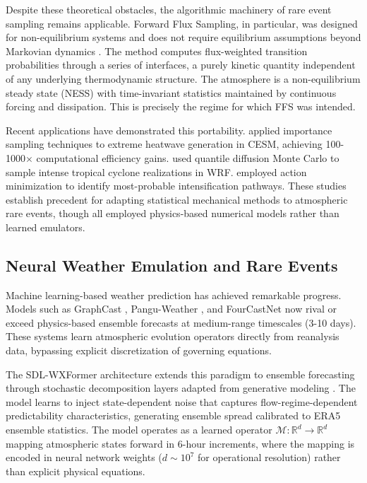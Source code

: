 \documentclass[11pt]{article}
\begin{document}
Despite these theoretical obstacles, the algorithmic machinery of rare event sampling remains applicable. Forward Flux Sampling, in particular, was designed for non-equilibrium systems and does not require equilibrium assumptions beyond Markovian dynamics \citep{allen2009forward}. The method computes flux-weighted transition probabilities through a series of interfaces, a purely kinetic quantity independent of any underlying thermodynamic structure. The atmosphere is a non-equilibrium steady state (NESS) with time-invariant statistics maintained by continuous forcing and dissipation. This is precisely the regime for which FFS was intended.

Recent applications have demonstrated this portability. \citet{ragone2018computation} applied importance sampling techniques to extreme heatwave generation in CESM, achieving 100-1000$\times$ computational efficiency gains. \citet{webber2019practical} used quantile diffusion Monte Carlo to sample intense tropical cyclone realizations in WRF. \citet{plotkin2019maximizing} employed action minimization to identify most-probable intensification pathways. These studies establish precedent for adapting statistical mechanical methods to atmospheric rare events, though all employed physics-based numerical models rather than learned emulators.

\subsection{Neural Weather Emulation and Rare Events}

Machine learning-based weather prediction has achieved remarkable progress. Models such as GraphCast \citep{lam2023graphcast}, Pangu-Weather \citep{bi2023pangu}, and FourCastNet \citep{pathak2022fourcastnet} now rival or exceed physics-based ensemble forecasts at medium-range timescales (3-10 days). These systems learn atmospheric evolution operators directly from reanalysis data, bypassing explicit discretization of governing equations.

The SDL-WXFormer architecture \citep{schreck2024sdl} extends this paradigm to ensemble forecasting through stochastic decomposition layers adapted from generative modeling \citep{karras2019stylebased}. The model learns to inject state-dependent noise that captures flow-regime-dependent predictability characteristics, generating ensemble spread calibrated to ERA5 ensemble statistics. The model operates as a learned operator $\mathcal{M}: \mathbb{R}^d \to \mathbb{R}^d$ mapping atmospheric states forward in 6-hour increments, where the mapping is encoded in neural network weights ($d \sim 10^7$ for operational resolution) rather than explicit physical equations.
\end{document}
